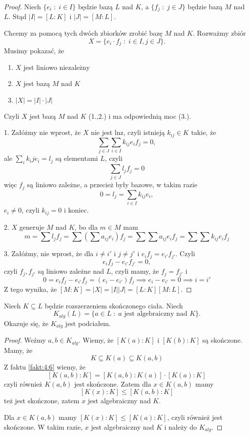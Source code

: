 \begin{proof}

Niech $\{e_i\;:\;i\in I\}$ będzie bazą $L$ nad $K$, a $\{f_j\;:\;j\in J\}$ będzie bazą $M$ nad $L$. Stąd $|I|=[L:K]$ i $|J|=[M:L]$.

Chcemy za pomocą tych dwóch zbiorków zrobić bazę $M$ nad $K$. Rozważmy zbiór
$$X=\{e_i\cdot f_j\;:\;i\in I,j\in J\}.$$
Musimy pokazać, że 
\begin{enumerate}
    \item $X$ jest liniowo niezależny
    \item $X$ jest bazą $M$ nad $K$
    \item $|X|=|I|\cdot|J|$
\end{enumerate}

Czyli $X$ jest bazą $M$ nad $K$ (1.,2.) i ma odpowiednią moc (3.).

1. Załóżmy nie wprost, że $X$ nie jest lnz, czyli istnieją $k_{ij}\in K$ takie, że
$$\sum\limits_{j\in J}\sum\limits_{i\in I}k_{ij}e_if_j=0,$$
ale $\sum\limits_ik_ije_i=l_j$ są elementami $L$, czyli
$$\sum\limits_{j\in J}l_jf_j=0$$
więc $f_j$ są liniowo zależne, a przecież były bazowe, w takim razie
$$0=l_j=\sum\limits_{i\in I}k_{ij}e_i,$$
$e_i\neq0$, czyli $k_{ij}=0$ i koniec.

2. $X$ generuje $M$ nad $K$, bo dla $m\in M$ mam
$$m=\sum l_jf_j=\sum\left(\sum a_{ij}e_i\right)f_j=\sum\sum a_{ij}e_if_j=\sum \sum k_{ij}e_if_j$$

3. Załóżmy, nie wprost, że dla $i\neq i'$ i $j\neq j'$ i $e_if_j=e_{i'}f_{j'}$. Czyli
$$e_if_j-e_{i'}f_{j'}=0,$$
czyli $f_j,f_{j'}$ są liniowo zależne nad $L$, czyli mamy, że $f_j=f_{j'}$ i
$$0=e_if_j-e_{i'}f_{j}=(e_i-e_{i'})f_j\implies e_i-e_{i'}=0\implies i=i'$$
Z tego wynika, że $[M:K]=|X|=|I||J|=[L:K][M:L]$.
\end{proof}
\begin{conclusion}
    Niech $K\subseteq L$ będzie rozszerzeniem skończonego ciała. Niech 
    $$K_{alg}(L)=\{a\in L\;:\;a\text{ jest algebraiczny nad }K\}.$$
    Okazuje się, że $K_{alg}$ jest podciałem.
\end{conclusion}

\begin{proof}

Weźmy $a,b\in K_{alg}$. Wiemy, że $[K(a):K]$ i $[K(b):K]$ są skończone. Mamy, że
$$K\subseteq K(a)\subseteq K(a, b)$$
Z faktu \ref{fakt:4:6} wiemy, że 
$$[K(a, b):K]=[K(a,b):K(a)]\cdot[K(a):K]$$
czyli również $K(a,b)$ jest skończone. Zatem dla $x\in K(a,b)$ mamy
$$[K(x):K]\leq[K(a,b):K]$$
też jest skończone, zatem $x$ jest algebraiczny nad $K$.
\medskip

Dla $x\in K(a, b)$ mamy $[K(x):K]\leq[K(a):K]$, czyli również jest skończone. W takim razie, $x$ jest algebraiczny nad $K$ i należy do $K_{alg}$.
\end{proof}

